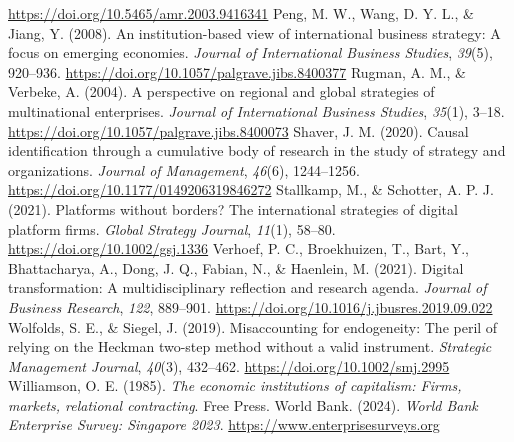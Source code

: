 \documentclass[12pt,a4paper]{article}
\begin{document}
\url{https://doi.org/10.5465/amr.2003.9416341} Peng, M. W., Wang, D. Y.
L., \& Jiang, Y. (2008). An institution-based view of international
business strategy: A focus on emerging economies. \emph{Journal of
International Business Studies}, \emph{39}(5), 920--936.
\url{https://doi.org/10.1057/palgrave.jibs.8400377} Rugman, A. M., \&
Verbeke, A. (2004). A perspective on regional and global strategies of
multinational enterprises. \emph{Journal of International Business
Studies}, \emph{35}(1), 3--18.
\url{https://doi.org/10.1057/palgrave.jibs.8400073} Shaver, J. M.
(2020). Causal identification through a cumulative body of research in
the study of strategy and organizations. \emph{Journal of Management},
\emph{46}(6), 1244--1256. \url{https://doi.org/10.1177/0149206319846272}
Stallkamp, M., \& Schotter, A. P. J. (2021). Platforms without borders?
The international strategies of digital platform firms. \emph{Global
Strategy Journal}, \emph{11}(1), 58--80.
\url{https://doi.org/10.1002/gsj.1336} Verhoef, P. C., Broekhuizen, T.,
Bart, Y., Bhattacharya, A., Dong, J. Q., Fabian, N., \& Haenlein, M.
(2021). Digital transformation: A multidisciplinary reflection and
research agenda. \emph{Journal of Business Research}, \emph{122},
889--901. \url{https://doi.org/10.1016/j.jbusres.2019.09.022} Wolfolds,
S. E., \& Siegel, J. (2019). Misaccounting for endogeneity: The peril of
relying on the Heckman two-step method without a valid instrument.
\emph{Strategic Management Journal}, \emph{40}(3), 432--462.
\url{https://doi.org/10.1002/smj.2995} Williamson, O. E. (1985).
\emph{The economic institutions of capitalism: Firms, markets,
relational contracting}. Free Press. World Bank. (2024). \emph{World
Bank Enterprise Survey: Singapore 2023}.
\url{https://www.enterprisesurveys.org}
\end{document}
